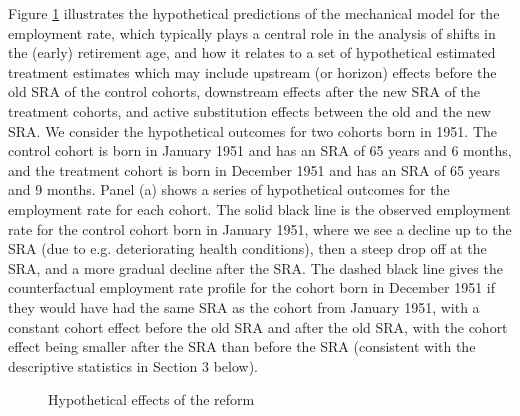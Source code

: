 \documentclass[12pt,a4paper]{article}
\begin{document}
Figure \ref{fig_mechanical} illustrates the hypothetical predictions of the mechanical model for the employment rate, which typically plays a central role in the analysis of shifts in the (early) retirement age, and how it relates to a set of hypothetical estimated treatment estimates which may include upstream (or horizon) effects before the old SRA of the control cohorts, downstream effects after the new SRA of the treatment cohorts, and active substitution effects between the old and the new SRA. We consider the hypothetical outcomes for two cohorts born in 1951. The control cohort is born in January 1951 and has an SRA of 65 years and 6 months, and the treatment cohort is born in December 1951 and has an SRA of 65 years and 9 months. Panel (a) shows a series of hypothetical outcomes for the employment rate for each cohort. The solid black line is the observed employment rate for the control cohort born in January 1951, where we see a decline up to the SRA (due to e.g. deteriorating health conditions), then a steep drop off at the SRA, and a more gradual decline after the SRA. The dashed black line gives the counterfactual employment rate profile for the cohort born in December 1951 if they would have had the same SRA as the cohort from January 1951, with a constant cohort effect before the old SRA and after the old SRA, with the cohort effect being smaller after the SRA than before the SRA (consistent with the descriptive statistics in Section 3 below).

\begin{figure}[!t]
	\caption{Hypothetical effects of the reform}
	\label{fig_mechanical}
	\begin{center}
	\end{center}
\end{figure}
\end{document}
